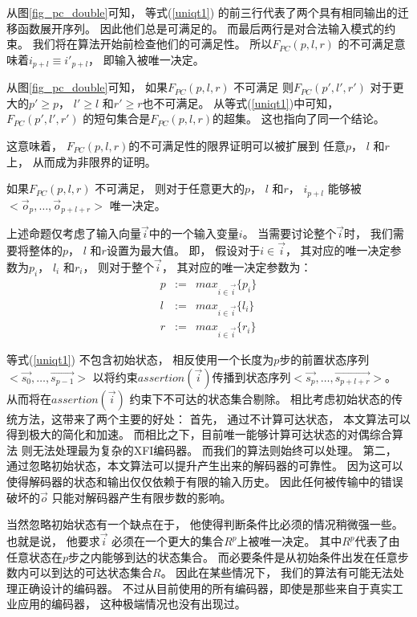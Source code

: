 从图\ref{fig_pc_double}可知，
等式(\ref{uniqt1}) 的前三行代表了两个具有相同输出的迁移函数展开序列。
因此他们总是可满足的。
而最后两行是对合法输入模式的约束。
我们将在算法开始前检查他们的可满足性。
所以$F_{PC}(p,l,r)$ 的不可满足意味着$i_{p+l}\equiv i'_{p+l}$，
即输入被唯一决定。

从图\ref{fig_pc_double}可知，
如果$F_{PC}(p,l,r)$ 不可满足
则$F_{PC}(p',l',r')$ 对于更大的$p'\ge p$， $l'\ge l$ 和$r'\ge r$也不可满足。
从等式(\ref{uniqt1})中可知，
$F_{PC}(p',l',r')$ 的短句集合是$F_{PC}(p,l,r)$的超集。
这也指向了同一个结论。

这意味着，
$F_{PC}(p,l,r)$的不可满足性的限界证明可以被扩展到
任意$p$， $l$ 和$r$上，
从而成为非限界的证明。

\begin{proposition}\label{prop_pc1}
如果$F_{PC}(p,l,r)$ 不可满足，
则对于任意更大的$p$， $l$ 和$r$，
$i_{p+l}$ 能够被$<\vec{o}_{p},\dots,\vec{o}_{p+l+r}>$ 唯一决定。
\end{proposition}


上述命题仅考虑了输入向量$\vec{i}$中的一个输入变量$i$。
当需要讨论整个$\vec{i}$时，
我们需要将整体的$p$， $l$ 和$r$设置为最大值。
即，
假设对于$i\in\vec{i}$，
其对应的唯一决定参数为$p_i$， $l_i$ 和$r_i$，
则对于整个$\vec{i}$，
其对应的唯一决定参数为：
\begin{equation}\label{equ_maxplr}
\begin{array}{ccc}
p & :=  & max_{i\in\vec{i}} \{p_i\}\\
l & :=  & max_{i\in\vec{i}} \{l_i\}\\
r & :=  & max_{i\in\vec{i}} \{r_i\}
\end{array}
\end{equation}

等式(\ref{uniqt1}) 不包含初始状态，
相反使用一个长度为$p$步的前置状态序列$<\vec{s_0},\dots,\vec{s_{p-1}}>$
以将约束$assertion(\vec{i})$传播到状态序列$<\vec{s_p},\dots,\vec{s_{p+l+r}}>$。
从而将在$assertion(\vec{i})$ 约束下不可达的状态集合剔除。
相比考虑初始状态的传统方法，这带来了两个主要的好处：
首先，
通过不计算可达状态，
本文算法可以得到极大的简化和加速。
而相比之下，目前唯一能够计算可达状态的对偶综合算法
则无法处理最为复杂的XFI编码器。
而我们的算法则始终可以处理。
第二，
通过忽略初始状态，本文算法可以提升产生出来的解码器的可靠性。
因为这可以使得解码器的状态和输出仅仅依赖于有限的输入历史。
因此任何被传输中的错误破坏的$\vec{o}$ 只能对解码器产生有限步数的影响。

当然忽略初始状态有一个缺点在于，
他使得判断条件比必须的情况稍微强一些。
也就是说，
他要求$\vec{i}$ 必须在一个更大的集合$R^p$上被唯一决定。
其中$R^p$代表了由任意状态在$p$步之内能够到达的状态集合。
而必要条件是从初始条件出发在任意步数内可以到达的可达状态集合$R$。
因此在某些情况下，
我们的算法有可能无法处理正确设计的编码器。
不过从目前使用的所有编码器，即使是那些来自于真实工业应用的编码器，
这种极端情况也没有出现过。



